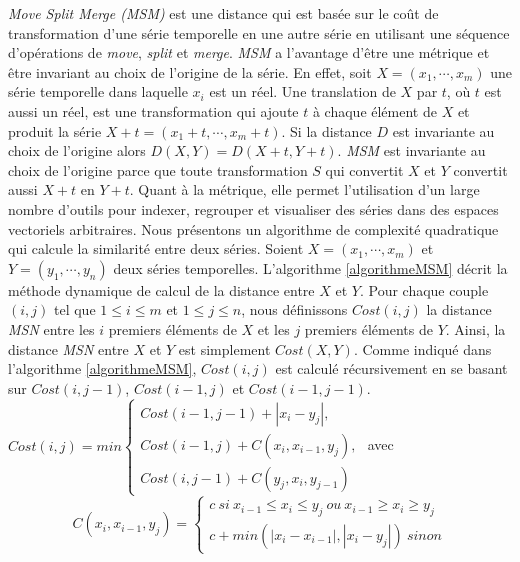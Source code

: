 {\em Move Split Merge (MSM)} est une distance qui est bas\'ee sur le co\^ut de transformation d'une s\'erie temporelle en une autre s\'erie en utilisant une s\'equence d'op\'erations de {\em move}, {\em split} et {\em merge}.
{\em MSM} a l'avantage d'\^etre une m\'etrique et \^etre invariant au choix de l'origine de la s\'erie. 
En effet, soit $X=(x_1, \cdots,x_m)$ une s\'erie temporelle dans laquelle $x_i$ est un r\'eel. Une translation de $X$ par $t$, o\`u $t$ est aussi un r\'eel, est une transformation qui ajoute $t$ \`a chaque \'el\'ement de $X$ et produit la s\'erie $X+t = (x_1+t, \cdots,x_m+t)$. 
Si la distance $D$ est invariante au choix de l'origine alors  $D(X, Y ) = D(X + t, Y + t)$. {\em MSM} est invariante au choix de l'origine parce que toute transformation $S$ qui convertit $X$ et $Y$ convertit aussi $X+t$ en $Y+t$. 
Quant \`a la m\'etrique, elle permet l'utilisation d'un large nombre d'outils pour indexer, regrouper et visualiser des s\'eries dans des espaces vectoriels arbitraires.
\newline
Nous pr\'esentons un algorithme de complexit\'e quadratique qui calcule la similarit\'e entre deux s\'eries.
Soient $X = (x_1, \cdots,x_m)$ et $Y = (y_1, \cdots, y_n)$ deux s\'eries temporelles. 
L'algorithme \ref{algorithmeMSM} d\'ecrit la m\'ethode dynamique de calcul de la distance entre $X$ et $Y$. Pour chaque  couple $(i,j)$ tel que $1 \le i \le m$ et $1 \le j \le n$, nous d\'efinissons $Cost(i,j)$ la distance {\em MSN} entre les $i$ premiers \'el\'ements de $X$ et les $j$ premiers \'el\'ements de $Y$. Ainsi, la distance {\em MSN} entre $X$ et $Y$ est simplement $Cost(X,Y)$.
Comme indiqu\'e dans l'algorithme \ref{algorithmeMSM}, $Cost(i,j)$ est calcul\'e r\'ecursivement en se basant sur   $Cost(i,j-1)$, $Cost(i-1,j)$ et $Cost(i-1,j-1)$.
\newline
$Cost(i,j) = min
				\begin{cases}
				Cost(i-1,j-1) + |x_i -y_j|, \\
				Cost(i-1, j) + C(x_i, x_{i-1}, y_j), \\
				Cost(i, j-1) + C(y_j, x_{i}, y_{j-1})
				\end{cases}
				$
avec 
$$
C(x_i, x_{i-1},y_j) = 
 	\begin{cases}
 	c ~si~ x_{i-1} \le x_i \le y_j ~ou~  x_{i-1} \ge x_i \ge y_j \\
 	c + min( |x_i - x_{i-1}|, |x_i -y_j| ) ~ sinon
 	\end{cases}
$$

